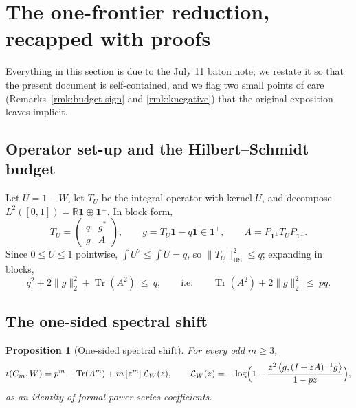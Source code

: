 \documentclass[11pt]{article}
\newtheorem{proposition}[theorem]{Proposition}
\newcommand{\one}{\mathbf 1}
\newcommand{\ip}[2]{\left\langle #1,#2\right\rangle}
\newcommand{\Tr}{\operatorname{Tr}}
\newcommand{\cL}{\mathcal L}
\begin{document}
\section{The one-frontier reduction, recapped with proofs}\label{sec:reduction}

Everything in this section is due to the July 11 baton note; we restate it so
that the present document is self-contained, and we flag two small points of
care (Remarks~\ref{rmk:budget-sign} and \ref{rmk:knegative}) that the original
exposition leaves implicit.

\subsection{Operator set-up and the Hilbert--Schmidt budget}

Let $U=1-W$, let $T_U$ be the integral operator with kernel $U$, and decompose
$L^2([0,1])=\mathbb R\one\oplus\one^\perp$.  In block form,
\begin{equation}\label{eq:blockTU}
        T_U=
        \begin{pmatrix}
        q&g^*\\
        g&A
        \end{pmatrix},
        \qquad
        g=T_U\one-q\one\in\one^\perp,
        \qquad
        A=P_{\one^\perp}T_UP_{\one^\perp}.
\end{equation}
Since $0\le U\le1$ pointwise, $\int U^2\le\int U=q$, so
$\|T_U\|_{\mathrm{HS}}^2\le q$; expanding in blocks,
\begin{equation}\label{eq:HS-budget}
        q^2+2\|g\|_2^2+\Tr(A^2)\ \le\ q,
        \qquad\text{i.e.}\qquad
        \Tr(A^2)+2\|g\|_2^2\ \le\ pq.
\end{equation}

\subsection{The one-sided spectral shift}

\begin{proposition}[One-sided spectral shift]\label{prop:shift}
For every odd $m\ge3$,
\begin{equation}\label{eq:one-sided-shift}
        t(C_m,W)=p^m-\Tr(A^m)+m\,[z^m]\,\cL_W(z),
        \qquad
        \cL_W(z)=-\log\Bigl(1-\frac{z^2\ip{g}{(I+zA)^{-1}g}}{1-pz}\Bigr),
\end{equation}
as an identity of formal power series coefficients.
\end{proposition}
\end{document}
